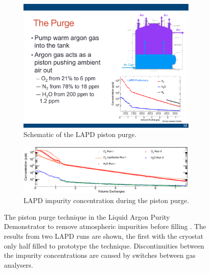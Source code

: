 \newsavebox{\largestimage}

\begin{figure}
  \centering
  \begin{subfigure}[t]{0.5\linewidth}
    \centering
    \includegraphics[width=0.98\textwidth]{LAPDPistonPurgeSchematic.pdf}
    \caption{Schematic of the LAPD piston purge.}
    \label{fig:LAPDPistonPurgeSchematic}
  \end{subfigure}\vspace{5mm}
  \begin{subfigure}[t]{0.7\linewidth}
    \centering
    \includegraphics[width=0.98\textwidth]{LAPDPistonPurgeImpurities.pdf}
    \caption{LAPD impurity concentration during the piston purge.}
    \label{fig:LAPDPistonPurgeImpurities}
  \end{subfigure}
  \caption[The piston purge technique in the Liquid Argon Purity Demonstrator to remove atmospheric impurities before filling.]{The piston purge technique in the Liquid Argon Purity Demonstrator to remove atmospheric impurities before filling \cite{LAPDJINST2014}.  The results from two LAPD runs are shown, the first with the cryostat only half filled to prototype the technique.  Discontinuities between the impurity concentrations are caused by switches between gas analysers.}
  \label{fig:LAPDPistonPurge}
\end{figure}


